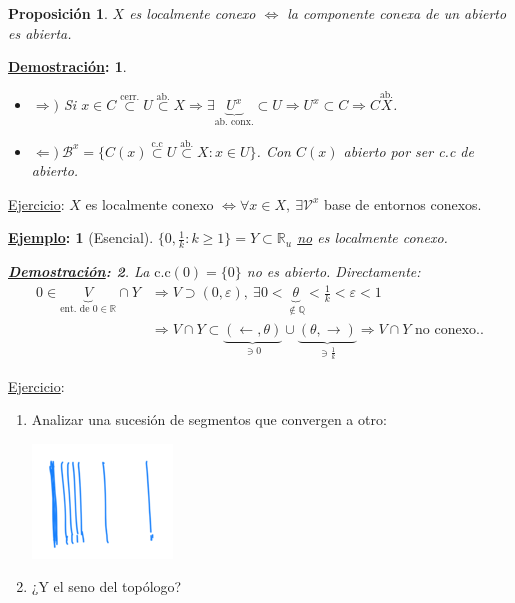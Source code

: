 \documentclass[10pt,a4paper,openright]{book}
\theoremstyle{break}
\newtheorem*{prop}{Proposición}
\newtheorem*{demo}{\underline{Demostración}:}
\newtheorem*{ej}{\underline{Ejemplo}:}
\begin{document}
\begin{prop}
$X$ es localmente conexo $\Leftrightarrow$ la componente conexa de un abierto es abierta.
\end{prop}
\begin{demo}
\begin{itemize}
    \item $\Rightarrow)$ Si $x \in C \stackrel{\text{cerr.}}{\subset} U \stackrel{\text{ab.}}{\subset} X \Rightarrow \exists \underbrace{U^x}_{\text{ab. conx.}} \subset U \Rightarrow U^x \subset C \Rightarrow C \stackrel{\text{ab.}}{X}$.
    \item $\Leftarrow)\ \mathcal{B}^x = \{C\left( x \right) \stackrel{\text{c.c}}{\subset} U \stackrel{\text{ab.}}{\subset} X : x \in U\}$. Con $C\left( x \right)$ abierto por ser c.c de abierto.
\end{itemize}
\end{demo}

\underline{Ejercicio}: $X$ es localmente conexo $\Leftrightarrow \forall x \in X,\ \exists \mathcal{V}^x$ base de entornos conexos.

\begin{ej}[Esencial]
$\{0, \frac{1}{k} : k \ge 1\} = Y \subset \mathbb{R}_u$ \underline{no} es localmente conexo. 
\begin{demo}
    La $\text{c.c}\left( 0 \right) = \{0\}$ no es abierto. Directamente:
    \begin{align*}
        0 \in \underbrace{V}_{\text{ent. de } 0 \in \mathbb{R}} \cap Y &\Rightarrow V \supset \left( 0, \varepsilon \right),\ \exists 0 < \underbrace{\theta}_{\not\in \mathbb{Q}} < \frac{1}{k} < \varepsilon < 1\\
        &\Rightarrow V\cap Y \subset \underbrace{\left( \leftarrow, \theta \right)}_{\ni 0} \cup \underbrace{\left( \theta, \rightarrow \right)}_{\ni \frac{1}{k}}  \Rightarrow V \cap Y \text{ no conexo.} 
    .\end{align*}
\end{demo}
\end{ej}

\underline{Ejercicio}:
\begin{enumerate}
    \item Analizar una sucesión de segmentos que convergen a otro:
    \begin{center}
        \includegraphics[scale=0.3]{images/suc_conv_otro} 
    \end{center}
    \item ¿Y el seno del topólogo?
\end{enumerate}
\end{document}
